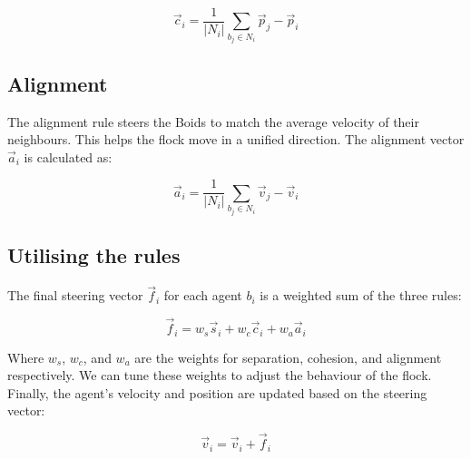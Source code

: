 $$\vec{c}_i = \frac{1}{|N_i|} \sum_{b_j \in N_i} \vec{p}_j - \vec{p}_i$$

\subsection{Alignment}

The alignment rule steers the Boids to match the average velocity of their neighbours. This helps the flock move in a unified direction. The alignment vector $\vec{a}_i$ is calculated as:

$$\vec{a}_i = \frac{1}{|N_i|} \sum_{b_j \in N_i} \vec{v}_j - \vec{v}_i$$

\subsection{Utilising the rules}

The final steering vector $\vec{f}_i$ for each agent $b_i$ is a weighted sum of the three rules:

$$\vec{f}_i = w_s \vec{s}_i + w_c \vec{c}_i + w_a \vec{a}_i$$

Where $w_s$, $w_c$, and $w_a$ are the weights for separation, cohesion, and alignment respectively. We can tune these weights to adjust the behaviour of the flock.
Finally, the agent's velocity and position are updated based on the steering vector:

$$\vec{v}_i = \vec{v}_i + \vec{f}_i$$